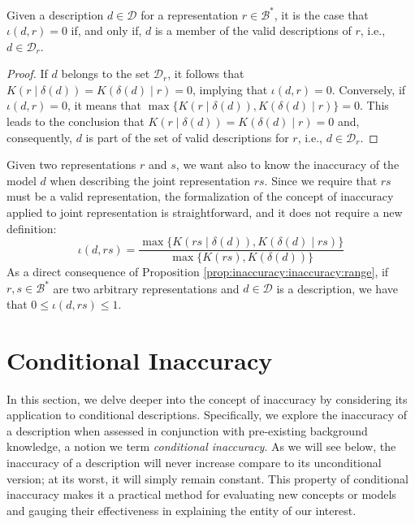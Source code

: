 \begin{proposition}
\label{prop:perfect_description}
Given a description $d \in \mathcal{D}$ for a representation $r \in \mathcal{B}^\ast$, it is the case that $\iota(d, r) = 0$ if, and only if, $d$ is a member of the valid descriptions of $r$, i.e., $d \in \mathcal{D}_r$.
\end{proposition}
\begin{proof}
If $d$ belongs to the set $\mathcal{D}_r$, it follows that $K \left( r \mid \delta(d) \right) = K \left( \delta(d) \mid r \right) = 0$, implying that $\iota(d, r) = 0$. Conversely, if $\iota(d, r) = 0$, it means that $\max\{ K \left( r \mid \delta(d) \right), K \left( \delta(d) \mid r \right) \} = 0$. This leads to the conclusion that $K \left( r \mid \delta(d) \right) = K \left( \delta(d) \mid r \right) = 0$ and, consequently, $d$ is part of the set of valid descriptions for $r$, i.e., $d \in \mathcal{D}_r$.
\end{proof}

Given two representations $r$ and $s$, we want also to know the inaccuracy of the model $d$ when describing the joint representation $rs$. Since we require that $rs$ must be a valid representation, the formalization of the concept of inaccuracy applied to joint representation is straightforward, and it does not require a new definition:
\[
\iota(d, rs) = \frac{ \max\{ K \left(rs \mid \delta(d) \right), K \left( \delta(d) \mid rs \right) \} } { \max\{ K(rs), K \left(\delta(d) \right) \} }
\]
As a direct consequence of Proposition \ref{prop:inaccuracy:inaccuracy:range}, if $r, s \in \mathcal{B}^\ast$ are two arbitrary representations and $d \in \mathcal{D}$ is a description, we have that $0 \leq \iota(d, rs) \leq 1$.

%
%

\section{Conditional Inaccuracy}

In this section, we delve deeper into the concept of inaccuracy by considering its application to conditional descriptions. Specifically, we explore the inaccuracy of a description when assessed in conjunction with pre-existing background knowledge, a notion we term \emph{conditional inaccuracy}. As we will see below, the inaccuracy of a description will never increase compare to its unconditional version; at its worst, it will simply remain constant. This property of conditional inaccuracy makes it a practical method for evaluating new concepts or models and gauging their effectiveness in explaining the entity of our interest.

